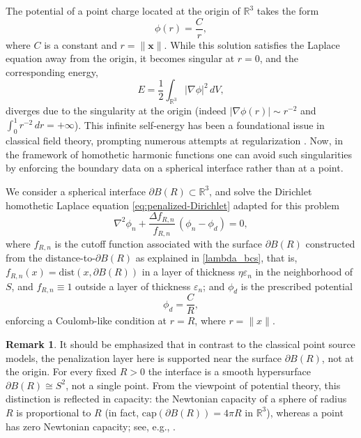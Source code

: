 \documentclass[preprint,12pt]{elsarticle}
\theoremstyle{plain}
\theoremstyle{definition}
\newtheorem{remark}[theorem]{Remark}
\theoremstyle{note}
\newcommand{\R}{\mathbb{R}}
\begin{document}
The potential of a point charge located at the origin of \( \mathbb{R}^3 \) takes the form
\[
\phi(r) = \frac{C}{r},
\]
where \( C \) is a constant and \( r = \| \mathbf{x} \| \). While this solution satisfies the Laplace equation away from the origin, it becomes singular at \( r = 0 \), and the corresponding energy,
\[
E = \frac{1}{2} \int_{\mathbb{R}^3} |\nabla \phi|^2 \, dV,
\]
diverges due to the singularity at the origin (indeed $|\nabla\phi(r)|\sim r^{-2}$ and $\int_0^1 r^{-2}\,dr=+\infty$). This infinite self-energy has been a foundational issue in classical field theory, prompting numerous attempts at regularization \cite{Jackson1998,BornInfeld1934}. Now, in the framework of homothetic harmonic functions one can avoid such singularities by enforcing the boundary data on a spherical interface rather than at a point.

We consider a spherical interface $\partial B(R) \subset \mathbb{R}^3$, and solve the Dirichlet homothetic Laplace equation \eqref{eq:penalized-Dirichlet} adapted for this problem
\begin{equation}\label{eq:dir_Lap_sphere}
\nabla^2 \phi_n + \frac{\Delta f_{R,n}}{f_{R,n}}\,(\phi_n-\phi_d)=0,
\end{equation}
where $f_{R,n}$ is the cutoff function associated with the surface $\partial B(R)$ constructed from the distance-to-$\partial B(R)$ as explained in \ref{lambda_bcs}, that is, $f_{R,n}(x)=\mathrm{dist}(x,\partial B(R))$ in a layer of thickness $\eta\varepsilon_n$ in the neighborhood of $S$, and $f_{R,n}\equiv 1$ outside a layer of thickness $\varepsilon_n$; and $\phi_d$ is the prescribed potential
\begin{equation}
\phi_d=\frac{C}{R},
\end{equation}
enforcing a Coulomb-like condition at $r=R$, where $r=\|x\|$.

\begin{remark}
It should be emphasized that in contrast to the classical point source models, the penalization layer here is supported near the surface $\partial B(R)$, not at the origin. For every fixed $R>0$ the interface is a smooth hypersurface $\partial B(R)\cong S^2$, not a single point. From the viewpoint of potential theory, this distinction is reflected in capacity: the Newtonian capacity of a sphere of radius $R$ is proportional to $R$ (in fact, $\mathrm{cap}(\partial B(R))=4\pi R$ in $\R^3$), whereas a point has zero Newtonian capacity; see, e.g., \cite{Kellogg1929,Landkof1972}.
\end{remark}
\end{document}
